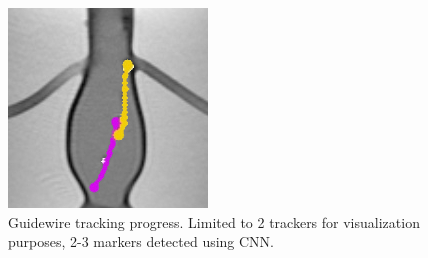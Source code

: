 \documentclass[conference]{IEEEtran}
\begin{document}
\begin{figure}[ht]
\begin{minipage}[t]{0.49\textwidth}
        \vspace{0.1cm}      \includegraphics[width=0.49\linewidth]{Conference/img/tracking-websocket-tracks-end.jpg}
    \end{minipage}
    \caption{Guidewire tracking progress. Limited to 2 trackers for visualization purposes, 2-3 markers detected using CNN.}
    \label{fig:tracking-algorithm}
\end{figure}
\end{document}
